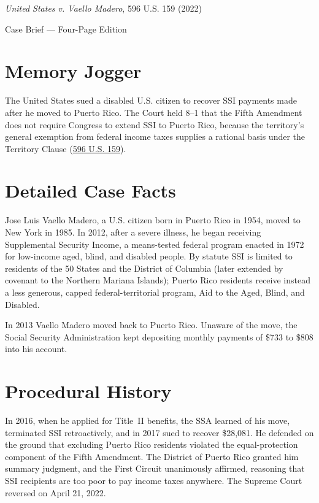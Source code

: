 \documentclass[12pt]{article}
\begin{document}
\begin{center}
{\LARGE \textit{United States v. Vaello Madero}, 596 U.S. 159 (2022)\par}
\vspace{0.8em}
{\large Case Brief --- Four-Page Edition\par}
\end{center}
\vspace{1em}

\section{Memory Jogger}

The United States sued a disabled U.S. citizen to recover SSI payments made after he moved to Puerto Rico. The Court held 8--1 that the Fifth Amendment does not require Congress to extend SSI to Puerto Rico, because the territory's general exemption from federal income taxes supplies a rational basis under the Territory Clause (\href{https://www.law.cornell.edu/supremecourt/text/20-303}{596 U.S. 159}).

\section{Detailed Case Facts}

Jose Luis Vaello Madero, a U.S. citizen born in Puerto Rico in 1954, moved to New York in 1985. In 2012, after a severe illness, he began receiving Supplemental Security Income, a means-tested federal program enacted in 1972 for low-income aged, blind, and disabled people. By statute SSI is limited to residents of the 50 States and the District of Columbia (later extended by covenant to the Northern Mariana Islands); Puerto Rico residents receive instead a less generous, capped federal-territorial program, Aid to the Aged, Blind, and Disabled.

In 2013 Vaello Madero moved back to Puerto Rico. Unaware of the move, the Social Security Administration kept depositing monthly payments of \$733 to \$808 into his account.

\section{Procedural History}

In 2016, when he applied for Title~II benefits, the SSA learned of his move, terminated SSI retroactively, and in 2017 sued to recover \$28,081. He defended on the ground that excluding Puerto Rico residents violated the equal-protection component of the Fifth Amendment. The District of Puerto Rico granted him summary judgment, and the First Circuit unanimously affirmed, reasoning that SSI recipients are too poor to pay income taxes anywhere. The Supreme Court reversed on April 21, 2022.
\end{document}
